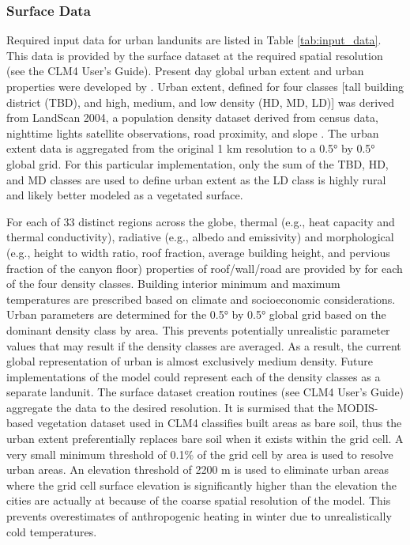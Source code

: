 \documentclass[12pt,authoryear]{elsarticle}
\numberwithin{equation}{section} %
\begin{document}
\subsubsection{Surface Data}
\label{sec:surface_data}
%
Required input data for urban landunits are listed in Table \ref{tab:input_data}. This data is provided by the surface dataset at the required spatial resolution (see the CLM4 User’s Guide). Present day global urban extent and urban properties were developed by \citet{JACKSONETAL10Ann.Assoc.Am.Geogr.}. Urban extent, defined for four classes [tall building district (TBD), and high, medium, and low density (HD, MD, LD)] was derived from LandScan 2004, a population density dataset derived from census data, nighttime lights satellite observations, road proximity, and slope \citet{dobsonLandScanGlobalPopulation2000}. The urban extent data is aggregated from the original 1 km resolution to a 0.5° by 0.5° global grid. For this particular implementation, only the sum of the TBD, HD, and MD classes are used to define urban extent as the LD class is highly rural and likely better modeled as a vegetated surface.

For each of 33 distinct regions across the globe, thermal (e.g., heat capacity and thermal conductivity), radiative (e.g., albedo and emissivity) and morphological (e.g., height to width ratio, roof fraction, average building height, and pervious fraction of the canyon floor) properties of roof/wall/road are provided by \citet{JACKSONETAL10Ann.Assoc.Am.Geogr.} for each of the four density classes. Building interior minimum and maximum temperatures are prescribed based on climate and socioeconomic considerations. Urban parameters are determined for the 0.5° by 0.5° global grid based on the dominant density class by area. This prevents potentially unrealistic parameter values that may result if the density classes are averaged. As a result, the current global representation of urban is almost exclusively medium density. Future implementations of the model could represent each of the density classes as a separate landunit. The surface dataset creation routines (see CLM4 User’s Guide) aggregate the data to the desired resolution. It is surmised that the MODIS-based vegetation dataset used in CLM4 classifies built areas as bare soil, thus the urban extent preferentially replaces bare soil when it exists within the grid cell. A very small minimum threshold of 0.1\% of the grid cell by area is used to resolve urban areas. An elevation threshold of 2200 m is used to eliminate urban areas where the grid cell surface elevation is significantly higher than the elevation the cities are actually at because of the coarse spatial resolution of the model. This prevents overestimates of anthropogenic heating in winter due to unrealistically cold temperatures.
\end{document}
